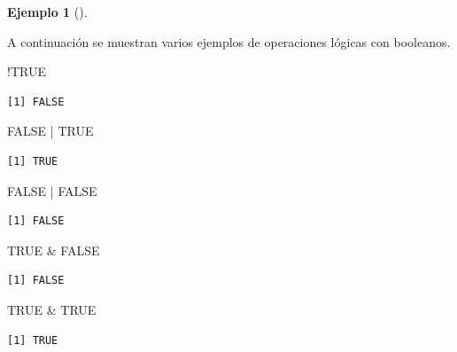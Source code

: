 \documentclass[
  a4paper,
]{scrreport}
\newenvironment{Shaded}{\begin{snugshade}}{\end{snugshade}}
\newcommand{\ConstantTok}[1]{\textcolor[rgb]{0.56,0.35,0.01}{#1}}
\newcommand{\SpecialCharTok}[1]{\textcolor[rgb]{0.37,0.37,0.37}{#1}}
\theoremstyle{definition}
\newtheorem{example}{Ejemplo}[chapter]
\theoremstyle{definition}
\theoremstyle{remark}
\begin{document}
\leavevmode{}%
\begin{example}[]\label{exm-operadores-logicos}

A continuación se muestran varios ejemplos de operaciones lógicas con
booleanos.

\begin{Shaded}
\begin{Highlighting}[]
\SpecialCharTok{!}\ConstantTok{TRUE}
\end{Highlighting}
\end{Shaded}

\begin{verbatim}
[1] FALSE
\end{verbatim}

\begin{Shaded}
\begin{Highlighting}[]
\ConstantTok{FALSE} \SpecialCharTok{|} \ConstantTok{TRUE}
\end{Highlighting}
\end{Shaded}

\begin{verbatim}
[1] TRUE
\end{verbatim}

\begin{Shaded}
\begin{Highlighting}[]
\ConstantTok{FALSE} \SpecialCharTok{|} \ConstantTok{FALSE}
\end{Highlighting}
\end{Shaded}

\begin{verbatim}
[1] FALSE
\end{verbatim}

\begin{Shaded}
\begin{Highlighting}[]
\ConstantTok{TRUE} \SpecialCharTok{\&} \ConstantTok{FALSE}
\end{Highlighting}
\end{Shaded}

\begin{verbatim}
[1] FALSE
\end{verbatim}

\begin{Shaded}
\begin{Highlighting}[]
\ConstantTok{TRUE} \SpecialCharTok{\&} \ConstantTok{TRUE}
\end{Highlighting}
\end{Shaded}

\begin{verbatim}
[1] TRUE
\end{verbatim}

\end{example}
\end{document}
